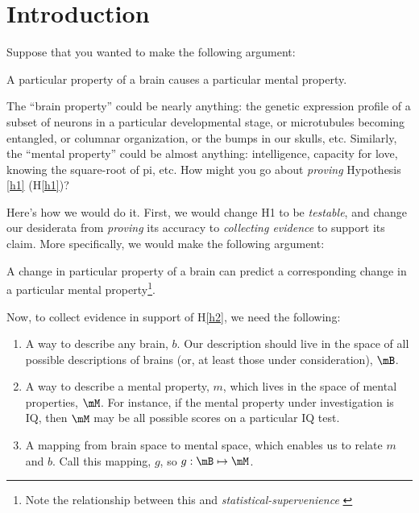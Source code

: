 %
%
%
%
%
%
%
%
%
%
%
%
%
%
%
%
%

\maketitle
\begin{abstract}
\end{abstract}

\section{Introduction} 

\label{sec:introduction}

Suppose that you wanted to make the following argument: 
\begin{hypo}
	\label{h1} A particular property of a brain causes a particular mental property. 
\end{hypo}

The ``brain property'' could be nearly anything: the genetic expression profile of a subset of neurons in a particular developmental stage, or microtubules becoming entangled, or columnar organization, or the bumps in our skulls, etc. Similarly, the ``mental property'' could be almost anything: intelligence, capacity for love, knowing the square-root of pi, etc. How might you go about \emph{proving} Hypothesis \ref{h1} (H\ref{h1})?

Here's how we would do it. First, we would change H1 to be \emph{testable}, and change our desiderata from \emph{proving} its accuracy to \emph{collecting evidence} to support its claim. More specifically, we would make the following argument:
\begin{hypo}
	\label{h2} A change in particular property of a brain can predict a corresponding change in a particular mental property\footnote{Note the relationship between this and \emph{statistical-supervenience} \cite{VogelsteinPriebe10}}. 
\end{hypo}

Now, to collect evidence in support of H\ref{h2}, we need the following:
\begin{enumerate}
	\item A way to describe any brain, $b$. Our description should live in the space of all possible descriptions of brains (or, at least those under consideration), $\mB$. 
	\item A way to describe a mental property, $m$, which lives in the space of mental properties, $\mM$. For instance, if the mental property under investigation is IQ, then $\mM$ may be all possible scores on a particular IQ test. 
	\item A mapping from brain space to mental space, which enables us to relate $m$ and $b$. Call this mapping, $g$, so $g: \mB \mapsto \mM$. 
\end{enumerate}

